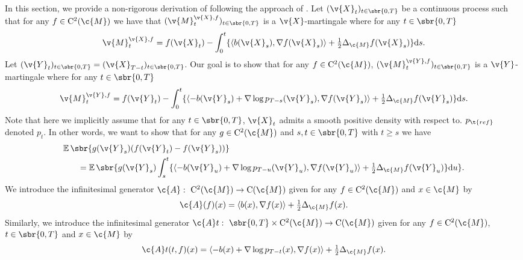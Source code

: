 In this section, we provide a non-rigorous derivation of  following the approach of \textcite{haussmann1986time}.
Let \((\v{X}_t)_{t \in \sbr{0,T}}\) be a continuous process such that for any \(f \in \mathrm{C}^2(\c{M})\) we have that \((\v{M}_t^{\v{X}, f})_{t \in \sbr{0,T}}\) is a \(\v{X}\)-martingale where for any \(t \in \sbr{0,T}\) \begin{equation} \label{eq:martingale_forward} { \v{M}_t^{\v{X}, f} = f(\v{X}_t) - \int_0^t \{ \langle b(\v{X}_s), \nabla f(\v{X}_s) \rangle + \tfrac{1}{2} \Delta_\c{M} f(\v{X}_s) \} \mathrm{d} s .
	}
\end{equation}
Let \((\v{Y}_t)_{t \in \sbr{0,T}} = (\v{X}_{T-t})_{t \in \sbr{0,T}}\).
Our goal is to show that for any \(f \in \mathrm{C}^2(\c{M})\), \((\v{M}_t^{\v{Y}, f})_{t \in \sbr{0,T}}\) is a \(\v{Y}\)-martingale where for any \(t \in \sbr{0,T}\) \begin{equation} { \v{M}_t^{\v{Y}, f} = f(\v{Y}_t) - \int_0^t \{ \langle - b(\v{Y}_s) + \nabla \log p_{T-s}(\v{Y}_s), \nabla f(\v{Y}_s) \rangle + \tfrac{1}{2} \Delta_\c{M} f(\v{Y}_s) \} \mathrm{d} s .
	}
\end{equation}
Note that here we implicitly assume that for any \(t \in \sbr{0,T}\), \(\v{X}_t\) admits a smooth positive density with respect to.
\(p_{\t{ref}}\) denoted \(p_t\).
In other words, we want to show that for any \(g \in \mathrm{C}^2(\c{M})\) and \(s, t \in \sbr{0,T}\) with \(t \geq s\) we have \begin{align} \label{eq:time_reversal_manifold_haussman} & {\E\sbr{g(\v{Y}_s)(f(\v{Y}_t) - f(\v{Y}_s))}} \\  & \qquad {= \E\sbr{g(\v{Y}_s)\int_s^t \{ \langle - b(\v{Y}_u) + \nabla \log p_{T-u}(\v{Y}_u), \nabla f(\v{Y}_u) \rangle + \tfrac{1}{2} \Delta_\c{M} f(\v{Y}_u) \} \mathrm{d} u} .
                 }
\end{align}
We introduce the infinitesimal generator \(\c{A}: \ \mathrm{C}^2(\c{M}) \to \mathrm{C}(\c{M})\) given for any \(f \in \mathrm{C}^2(\c{M})\) and \(x \in \c{M}\) by \begin{equation} \c{A} (f)(x) = \langle b(x) , \nabla f(x) \rangle + \tfrac{1}{2} \Delta_\c{M} f(x) .
\end{equation}
Similarly, we introduce the infinitesimal generator \(\c{A}t: \ \sbr{0,T} \times \mathrm{C}^2(\c{M}) \to \mathrm{C}(\c{M})\) given for any \(f \in \mathrm{C}^2(\c{M})\), \(t \in \sbr{0,T}\) and \(x \in \c{M}\) by \begin{equation} \c{A}t (t, f)(x) = \langle -b(x) + \nabla \log p_{T-t}(x), \nabla f(x) \rangle + \tfrac{1}{2} \Delta_\c{M} f(x) .
\end{equation}
